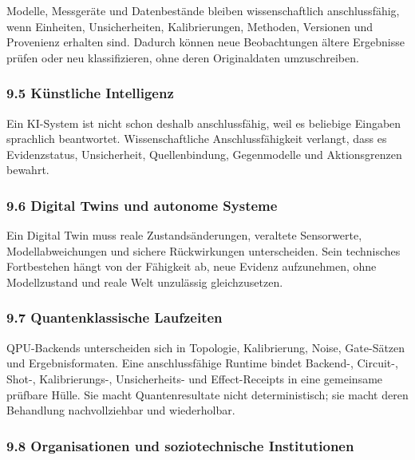 \documentclass[
  10pt,
  a4paper,
]{article}
\begin{document}
Modelle, Messgeräte und Datenbestände bleiben wissenschaftlich
anschlussfähig, wenn Einheiten, Unsicherheiten, Kalibrierungen,
Methoden, Versionen und Provenienz erhalten sind. Dadurch können neue
Beobachtungen ältere Ergebnisse prüfen oder neu klassifizieren, ohne
deren Originaldaten umzuschreiben.

\hypertarget{kuxfcnstliche-intelligenz}{%
\subsubsection{9.5 Künstliche
Intelligenz}\label{kuxfcnstliche-intelligenz}}

Ein KI-System ist nicht schon deshalb anschlussfähig, weil es beliebige
Eingaben sprachlich beantwortet. Wissenschaftliche Anschlussfähigkeit
verlangt, dass es Evidenzstatus, Unsicherheit, Quellenbindung,
Gegenmodelle und Aktionsgrenzen bewahrt.

\hypertarget{digital-twins-und-autonome-systeme}{%
\subsubsection{9.6 Digital Twins und autonome
Systeme}\label{digital-twins-und-autonome-systeme}}

Ein Digital Twin muss reale Zustandsänderungen, veraltete Sensorwerte,
Modellabweichungen und sichere Rückwirkungen unterscheiden. Sein
technisches Fortbestehen hängt von der Fähigkeit ab, neue Evidenz
aufzunehmen, ohne Modellzustand und reale Welt unzulässig
gleichzusetzen.

\hypertarget{quantenklassische-laufzeiten}{%
\subsubsection{9.7 Quantenklassische
Laufzeiten}\label{quantenklassische-laufzeiten}}

QPU-Backends unterscheiden sich in Topologie, Kalibrierung, Noise,
Gate-Sätzen und Ergebnisformaten. Eine anschlussfähige Runtime bindet
Backend-, Circuit-, Shot-, Kalibrierungs-, Unsicherheits- und
Effect-Receipts in eine gemeinsame prüfbare Hülle. Sie macht
Quantenresultate nicht deterministisch; sie macht deren Behandlung
nachvollziehbar und wiederholbar.

\hypertarget{organisationen-und-soziotechnische-institutionen}{%
\subsubsection{9.8 Organisationen und soziotechnische
Institutionen}\label{organisationen-und-soziotechnische-institutionen}}
\end{document}

